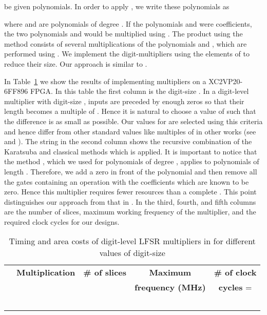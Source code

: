 \documentclass{article}
\begin{document}
be given polynomials. In order to apply , we
write these polynomials as 

where  and  are
polynomials of degree .
If the polynomials  and  were coefficients,
the two polynomials  and  would be multiplied using
. The product using the method 
consists of several multiplications of the polynomials  and
, which are performed using .
We implement the digit-multipliers using the elements of 
to reduce their size. Our approach is similar to \cite{gatsho06}.

In Table~\ref{tab:lfsr397costs} we show the results of implementing
 multipliers on a XC2VP20-6FF896 FPGA. In this
table the first column is the digit-size . In a digit-level
multiplier with digit-size , inputs are preceded by enough zeros
so that their length becomes a multiple of . Hence it is natural to
choose a value of  such that the difference  is as small as possible. Our values for  are selected using
this criteria and hence differ from other standard values like
multiples of  in other works (see \cite{bergua03} and
\cite{kermar05}). 
The string in the second column shows the recursive combination of the
Karatsuba and classical methods which is applied.
It is important to notice that the method ,
which we used for polynomials of degree , applies to polynomials of
length . 
Therefore, we add a zero in front of the polynomial and then remove all
the gates containing an operation with the coefficients which are
known to be zero.
Hence this multiplier requires fewer resources than a complete
. This point distinguishes our
approach from that in \cite{gatsho06}. In the third, fourth, and fifth
columns are the number of slices, maximum working frequency of the
multiplier, and the required clock cycles for our designs.   

\begin{table}
\caption{Timing and area costs of digit-level LFSR multipliers in
   for different values of digit-size }
\begin{scriptsize}
\begin{tabular}{|c|c|c|c|c|}\hline
{} & {\bf Multiplication} & {\bf \# of slices} & {\bf Maximum} & {\bf \# of clock}\\
 & & & {\bf frequency (MHz)}& {\bf cycles} = \\ \hline
 &  &  &  & \\
 &  &  &  & \\
 &  &  &  & \\
 &  &  &  & \\
 &  &  &  & \\ \hline
\end{tabular}
\end{scriptsize}
\label{tab:lfsr397costs}
\end{table}
 
\end{document}
